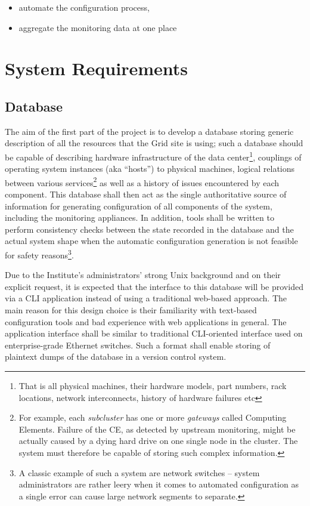 \documentclass{article}
\begin{document}
\begin{itemize}
    \item{automate the configuration process,}
    \item{aggregate the monitoring data at one place}
\end{itemize}

\section{System Requirements}

\subsection{Database}

The aim of the first part of the project is to develop a database storing generic description of all the resources that the Grid
site is using; such a database should be capable of describing hardware infrastructure of the data center\footnote{That is all
physical machines, their hardware models, part numbers, rack locations, network interconnects, history of hardware failures etc},
couplings of operating system instances (aka ``hosts'') to physical machines, logical relations between various
services\footnote{For example, each {\em subcluster} has one or more {\em gateways} called Computing Elements.  Failure of the CE,
as detected by upstream monitoring, might be actually caused by a dying hard drive on one single node in the cluster.  The system
must therefore be capable of storing such complex information.} as well as a history of issues encountered by each component.
This database shall then act as the single authoritative source of information for generating configuration of all components of
the system, including the monitoring appliances.  In addition, tools shall be written to perform consistency checks between the
state recorded in the database and the actual system shape when the automatic configuration generation is not feasible for safety
reasons\footnote{A classic example of such a system are network switches -- system administrators are rather leery when it comes
to automated configuration as a single error can cause large network segments to separate.}.

Due to the Institute's administrators' strong Unix background and on their explicit request, it is expected that the interface to
this database will be provided via a CLI application instead of using a traditional web-based approach.  The main reason for this
design choice is their familiarity with text-based configuration tools and bad experience with web applications in general.  The
application interface shall be similar to traditional CLI-oriented interface used on enterprise-grade Ethernet switches.  Such a
format shall enable storing of plaintext dumps of the database in a version control system.
\end{document}
